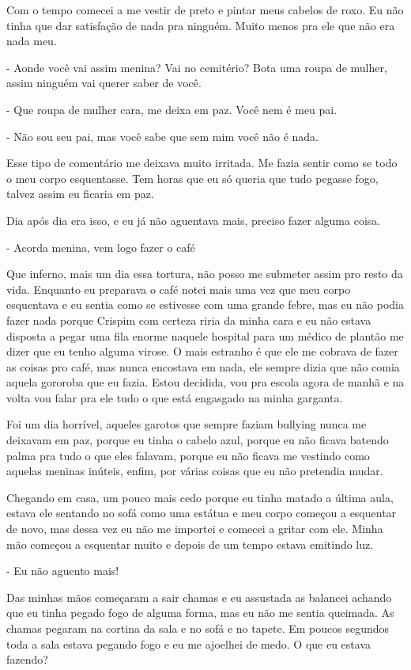 Com o tempo comecei a me vestir de preto e pintar meus cabelos de roxo. Eu não tinha que dar satisfação de nada pra ninguém. Muito menos pra ele que não era nada meu.

- Aonde você vai assim menina? Vai no cemitério? Bota uma roupa de mulher, assim ninguém vai querer saber de você.

- Que roupa de mulher cara, me deixa em paz. Você nem é meu pai.

- Não sou seu pai, mas você sabe que sem mim você não é nada.

Esse tipo de comentário me deixava muito irritada. Me fazia sentir como se todo o meu corpo esquentasse. Tem horas que eu só queria que tudo pegasse fogo, talvez assim eu ficaria em paz.

Dia após dia era isso, e eu já não aguentava mais, preciso fazer alguma coisa.

- Acorda menina, vem logo fazer o café

Que inferno, mais um dia essa tortura, não posso me submeter assim pro resto da vida. Enquanto eu preparava o café notei mais uma vez que meu corpo esquentava e eu sentia como se estivesse com uma grande febre, mas eu não podia fazer nada porque Crispim com certeza riria da minha cara e eu não estava disposta a pegar uma fila enorme naquele hospital para um médico de plantão me dizer que eu tenho alguma virose. O mais estranho é que ele me cobrava de fazer as coisas pro café, mas nunca encostava em nada, ele sempre dizia que não comia aquela gororoba que eu fazia. Estou decidida, vou pra escola agora de manhã e na volta vou falar pra ele tudo o que está engasgado na minha garganta.

Foi um dia horrível, aqueles garotos que sempre faziam bullying nunca me deixavam em paz, porque eu tinha o cabelo azul, porque eu não ficava batendo palma pra tudo o que eles falavam, porque eu não ficava me vestindo como aquelas meninas inúteis, enfim, por várias coisas que eu não pretendia mudar.

Chegando em casa, um pouco mais cedo porque eu tinha matado a última aula, estava ele sentando no sofá como uma estátua e meu corpo começou a esquentar de novo, mas dessa vez eu não me importei e comecei a gritar com ele. Minha mão começou a esquentar muito e depois de um tempo estava emitindo luz.

- Eu não aguento mais!

Das minhas mãos começaram a sair chamas e eu assustada as balancei achando que eu tinha pegado fogo de alguma forma, mas eu não me sentia queimada. As chamas pegaram na cortina da sala e no sofá e no tapete. Em poucos segundos toda a sala estava pegando fogo e eu me ajoelhei de medo. O que eu estava fazendo?

